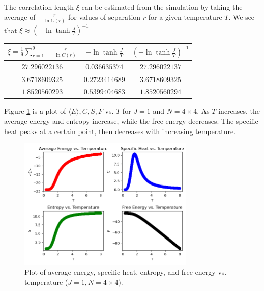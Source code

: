\documentclass{article}
\begin{document}
\clearpage

\problem
The correlation length $\xi$ can be estimated from the simulation by taking the average of $-\frac{r}{\ln C\left(r\right)}$ for values of separation $r$ for a given temperature $T$. We see that $\xi \approx {\left(-\ln\tanh\frac{J}{T}\right)}^{-1}$
\begin{center}
    \begin{tabular}{|c|c|c|}
        \hline
        $\xi = \frac{1}{9}\sum_{r=1}^{9} -\frac{r}{\ln C(r)}$ & $-\ln\tanh\frac{J}{T}$ & ${\left(-\ln\tanh\frac{J}{T}\right)}^{-1}$ \\
        \hline
        $27.296022136$ & 
        $0.036635374$ &
        $27.296022137$\\
        \hline
        $3.6718609325$ & 
        $0.2723414689$ & 
        $3.6718609325$ \\
        \hline
        $1.8520560293$ & 
        $0.5399404683$ & 
        $1.8520560294$ \\
        \hline
    \end{tabular}
\end{center}

\clearpage

\problem
Figure \ref{fig:fig2} is a plot of $\langle E \rangle, C, S, F$ vs. $T$ for $J = 1$ and $N = 4 \times 4$. As $T$ increases, the average energy and entropy increase, while the free energy decreases. The specific heat peaks at a certain point, then decreases with increasing temperature.
\begin{figure}[!htb]
    \centering
    \includegraphics[width=0.75\textwidth]{../code/phy112l_lab4/4-7.png}
    \caption{Plot of average energy, specific heat, entropy, and free energy vs. temperature ($J = 1, N = 4 \times 4$).}
    \label{fig:fig2}
\end{figure}
\end{document}
